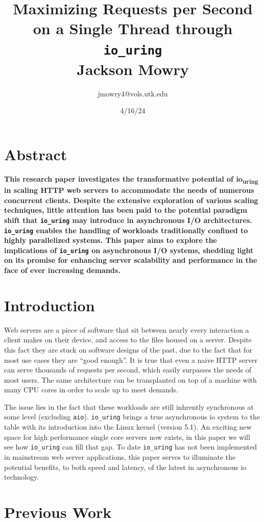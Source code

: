 \documentclass[letterpaper, 10pt, twocolumn]{article}
\author{jmowry4@vols.utk.edu}
\date{4/16/24}
\title{\textbf{Maximizing Requests per Second on a Single Thread through \texttt{io\_uring}}\\\medskip
\large Jackson Mowry}
\begin{document}
\maketitle

\section{Abstract}
\label{sec:orga0a0b56}
\textbf{This research paper investigates the transformative potential of io\textsubscript{uring} in scaling HTTP web servers to accommodate the needs of numerous concurrent clients. Despite the extensive exploration of various scaling techniques, little attention has been paid to the potential paradigm shift that \texttt{io\_uring} may introduce in asynchronous I/O architectures. \texttt{io\_uring} enables the handling of workloads traditionally confined to highly parallelized systems. This paper aims to explore the implications of \texttt{io\_uring} on asynchronous I/O systems, shedding light on its promise for enhancing server scalability and performance in the face of ever increasing demands.}

\section{Introduction}
\label{sec:org16db8dc}
Web servers are a piece of software that sit between nearly every interaction a client makes on their device, and access to the files housed on a server. Despite this fact they are stuck on software designs of the past, due to the fact that for most use cases they are ``good enough''. It is true that even a naive HTTP server can serve thousands of requests per second, which easily surpasses the needs of most users. The same architecture can be transplanted on top of a machine with many CPU cores in order to scale up to meet demands.

The issue lies in the fact that these workloads are still inhrently synchronous at some level (excluding \texttt{aio}). \texttt{io\_uring} brings a true asynchronous io system to the table with its introduction into the Linux kernel (version 5.1). An exciting new space for high performance single core servers now exists, in this paper we will see how \texttt{io\_uring} can fill that gap. To date \texttt{io\_uring} has not been implemented in mainstream web server applications, this paper serves to illuminate the potential benefits, to both speed and latency, of the latest in asynchronous io technology.

\section{Previous Work}
\label{sec:org9d63bc5}
\end{document}
